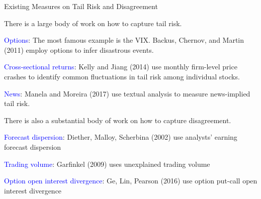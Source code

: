 \documentclass[11pt, aspectratio=169]{beamer}
\newenvironment{wideitemize}{\itemize\addtolength{\itemsep}{10pt}}{\enditemize}
\begin{document}
\begin{frame}{Existing Measures on Tail Risk and Disagreement}
  \begin{wideitemize}
  \item There is a large body of work on how to capture tail risk.
    \begin{wideitemize}
    \item \textcolor{blue}{Options}: The most famous example is the VIX. Backus, Chernov, and Martin (2011) employ options to infer disastrous events.
      \vspace{-0.2 cm}
    \item \textcolor{blue}{Cross-sectional returns}: Kelly and Jiang (2014) use monthly firm-level price crashes to identify common fluctuations in tail risk among individual stocks.
      \vspace{-0.2 cm}
    \item \textcolor{blue}{News}: Manela and Moreira (2017) use textual analysis to measure news-implied tail risk.
    \end{wideitemize}
  \item There is also a substantial body of work on how to capture disagreement.
    \begin{wideitemize}
    \item \textcolor{blue}{Forecast dispersion}: Diether, Malloy, Scherbina (2002) use analysts' earning forecast dispersion
      \vspace{-0.2 cm}
    \item \textcolor{blue}{Trading volume}: Garfinkel (2009) uses unexplained trading volume
      \vspace{-0.2 cm}
    \item \textcolor{blue}{Option open interest divergence}: Ge, Lin, Pearson (2016) use option put-call open interest divergence
    \end{wideitemize}
  \end{wideitemize}
\end{frame}
\end{document}
